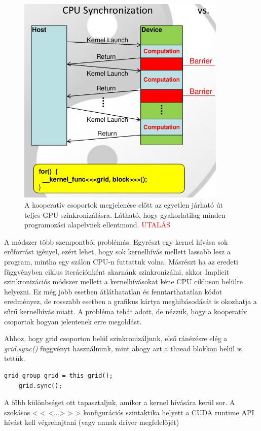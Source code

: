 \begin{figure}[ht!]
	\centering
	
	\includegraphics[width=100mm, keepaspectratio]{figures/Implicit synchronization.png}
	\caption{A kooperatív csoportok megjelenése előtt az egyetlen járható út teljes GPU szinkronizálásra. Látható, hogy gyakorlatilag minden programozási alapelvnek ellentmond. \textcolor{red}{UTALÁS}}
	\label{fig:Implicitsync}
\end{figure}

A módszer több szempontból problémás. Egyrészt egy kernel hívása sok erőforrást igényel, ezért lehet, hogy sok kernelhívás mellett lassabb lesz a program, mintha egy szálon CPU-n futtattuk volna. Másrészt ha az eredeti függvényben ciklus iterációnként akarnánk szinkronizálni, akkor Implicit szinkronizációs módszer mellett a kernelhívásokat kéne CPU cikluson belülre helyezni. Ez még jobb esetben átláthatatlan és fenntarthatatlan kódot eredményez, de rosszabb esetben a grafikus kártya meghibásodását is okozhatja a sűrű kernelhívás miatt. A probléma tehát adott, de nézzük, hogy a kooperatív csoportok hogyan jelentenek erre megoldást.

Ahhoz, hogy grid csoporton belül szinkronizáljunk, első ránézésre elég a \textit{grid.sync()} függvényt használnunk, mint ahogy azt a thread blokkon belül is tettük.

\begin{lstlisting}[style=CStyle]
	grid_group grid = this_grid();
	grid.sync();
\end{lstlisting}

A főbb különbséget ott tapasztaljuk, amikor a kernel hívására kerül sor. A szokásos < < <...> > > konfigurációs szintaktika helyett a CUDA runtime API hívást kell végrehajtani (vagy annak driver megfelelőjét) \cite{CooperativeLaunchkernel}

